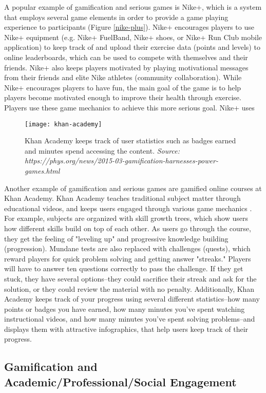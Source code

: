 A popular example of gamification and serious games is Nike+, which is a system that employs several game elements in order to provide a game playing experience to participants \cite{Nike} (Figure \ref{nike-plus}). Nike+ encourages players to use Nike+ equipment (e.g. Nike+ FuelBand, Nike+ shoes, or Nike+ Run Club mobile application) to keep track of and upload their exercise data (points and levels) to online leaderboards, which can be used to compete with themselves and their friends. Nike+ also keeps players motivated by playing motivational messages from their friends and elite Nike athletes (community collaboration). While Nike+ encourages players to have fun, the main goal of the game is to help players become motivated enough to improve their health through exercise. Players use these game mechanics to achieve this more serious goal. Nike+ uses 

\begin{figure}[h]
\centering
\texttt{[image: khan-academy]}
\caption{Khan Academy keeps track of user statistics such as badges earned and minutes spend accessing the content. \textit{Source: https://phys.org/news/2015-03-gamification-harnesses-power-games.html}}
\label{khan-academy}
\end{figure}	

Another example of gamification and serious games are gamified online courses at Khan Academy. Khan Academy teaches traditional subject matter through educational videos, and keeps users engaged through various game mechanics \cite{khan_academy}. For example, subjects are organized with skill growth trees, which show users how different skills build on top of each other. As users go through the course, they get the feeling of "leveling up" and progressive knowledge building (progression). Mundane tests are also replaced with challenges (quests), which reward players for quick problem solving and getting answer "streaks." Players will have to answer ten questions correctly to pass the challenge. If they get stuck, they have several options--they could sacrifice their streak and ask for the solution, or they could review the material with no penalty. Additionally, Khan Academy keeps track of your progress using several different statistics--how many points or badges you have earned, how many minutes you've spent watching instructional videos, and how many minutes you've spent solving problems--and displays them with attractive infographics, that help users keep track of their progress. 

\subsection{Gamification and Academic/Professional/Social Engagement}

